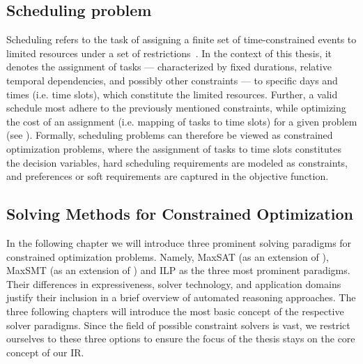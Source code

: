 \subsection{Scheduling problem}
Scheduling refers to the task of assigning a finite set of time-constrained events to limited resources under a set of restrictions~\cite{bib:2018-baker}. In the context of this thesis, it denotes the assignment of tasks --- characterized by fixed durations, relative temporal dependencies, and possibly other constraints --- to specific days and times (i.e. time slots), which constitute the limited resources. Further, a valid schedule most adhere to the previously mentioned constraints, while optimizing the cost of an assignment (i.e. mapping of tasks to time slots) for a given problem (see ). Formally, scheduling problems can therefore be viewed as constrained optimization problems, where the assignment of tasks to time slots constitutes the decision variables, hard scheduling requirements are modeled as constraints, and preferences or soft requirements are captured in the objective function.

\subsection{Solving Methods for Constrained Optimization}
In the following chapter we will introduce three prominent solving paradigms for constrained optimization problems. Namely, \ac{MaxSAT} (as an extension of ), \ac{MaxSMT} (as an extension of ) and \ac{ILP} as the three most prominent paradigms. Their differences in expressiveness, solver technology, and application domains justify their inclusion in a brief overview of automated reasoning approaches. The three following chapters will introduce the most basic concept of the respective solver paradigms. Since the field of possible constraint solvers is vast, we restrict ourselves to these three options to ensure the focus of the thesis stays on the core concept of our \acl{IR}.

